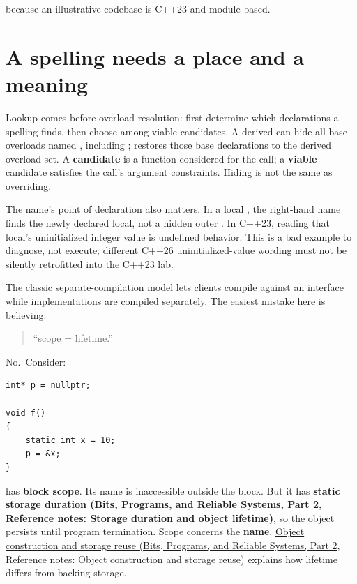 because an illustrative codebase is C++23 and module-based.

\section{A spelling needs a place and a meaning}\label{05-engine-i-ch002-a-spelling-needs-a-place-and-a-meaning}

\hypertarget{05-engine-i-ch002-a-spelling-needs-a-place-and-a-meaning}{}

Lookup comes before overload resolution: first determine which declarations a spelling finds, then choose among viable candidates. A derived  can hide all base overloads named , including ;  restores those base declarations to the derived overload set. A \textbf{candidate} is a function considered for the call; a \textbf{viable} candidate satisfies the call's argument constraints. Hiding is not the same as overriding.

The name's point of declaration also matters. In a local , the right-hand name finds the newly declared local, not a hidden outer . In C++23, reading that local's uninitialized integer value is undefined behavior. This is a bad example to diagnose, not execute; different C++26 uninitialized-value wording must not be silently retrofitted into the C++23 lab.

The classic separate-compilation model lets clients compile against an interface while implementations are compiled separately. The easiest mistake here is believing:

\begin{quote}
``scope = lifetime.''
\end{quote}

No.~Consider:

\begin{verbatim}
int* p = nullptr;

void f()
{
    static int x = 10;
    p = &x;
}
\end{verbatim}

 has \textbf{block scope}. Its name  is inaccessible outside the block. But it has \textbf{static \href{../01-Bits-Programs-and-Reliable-Systems-P02/main.pdf\#nameddest=appendix-0b104bcba06b}{storage duration (Bits, Programs, and Reliable Systems, Part 2, Reference notes: Storage duration and object lifetime)}}, so the object persists until program termination. Scope concerns the \textbf{name}. \href{../01-Bits-Programs-and-Reliable-Systems-P02/main.pdf\#nameddest=appendix-a82f9c438857}{Object construction and storage reuse (Bits, Programs, and Reliable Systems, Part 2, Reference notes: Object construction and storage reuse)} explains how lifetime differs from backing storage.

